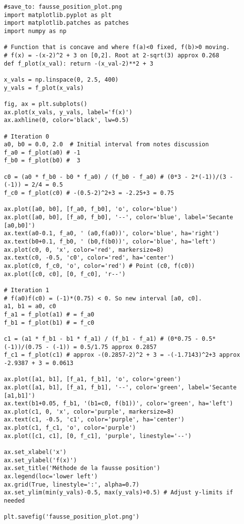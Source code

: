 \begin{verbatim}
#save_to: fausse_position_plot.png
import matplotlib.pyplot as plt
import matplotlib.patches as patches
import numpy as np

# Function that is concave and where f(a)<0 fixed, f(b)>0 moving.
# f(x) = -(x-2)^2 + 3 on [0,2]. Root at 2-sqrt(3) approx 0.268
def f_plot(x_val): return -(x_val-2)**2 + 3

x_vals = np.linspace(0, 2.5, 400)
y_vals = f_plot(x_vals)

fig, ax = plt.subplots()
ax.plot(x_vals, y_vals, label='f(x)')
ax.axhline(0, color='black', lw=0.5)

# Iteration 0
a0, b0 = 0.0, 2.0  # Initial interval from notes discussion
f_a0 = f_plot(a0) # -1
f_b0 = f_plot(b0) #  3

c0 = (a0 * f_b0 - b0 * f_a0) / (f_b0 - f_a0) # (0*3 - 2*(-1))/(3 - (-1)) = 2/4 = 0.5
f_c0 = f_plot(c0) # -(0.5-2)^2+3 = -2.25+3 = 0.75

ax.plot([a0, b0], [f_a0, f_b0], 'o', color='blue')
ax.plot([a0, b0], [f_a0, f_b0], '--', color='blue', label='Secante [a0,b0]')
ax.text(a0-0.1, f_a0, ' (a0,f(a0))', color='blue', ha='right')
ax.text(b0+0.1, f_b0, ' (b0,f(b0))', color='blue', ha='left')
ax.plot(c0, 0, 'x', color='red', markersize=8)
ax.text(c0, -0.5, 'c0', color='red', ha='center')
ax.plot(c0, f_c0, 'o', color='red') # Point (c0, f(c0))
ax.plot([c0, c0], [0, f_c0], 'r--')

# Iteration 1
# f(a0)f(c0) = (-1)*(0.75) < 0. So new interval [a0, c0].
a1, b1 = a0, c0
f_a1 = f_plot(a1) # = f_a0
f_b1 = f_plot(b1) # = f_c0

c1 = (a1 * f_b1 - b1 * f_a1) / (f_b1 - f_a1) # (0*0.75 - 0.5*(-1))/(0.75 - (-1)) = 0.5/1.75 approx 0.2857
f_c1 = f_plot(c1) # approx -(0.2857-2)^2 + 3 = -(-1.7143)^2+3 approx -2.9387 + 3 = 0.0613

ax.plot([a1, b1], [f_a1, f_b1], 'o', color='green')
ax.plot([a1, b1], [f_a1, f_b1], '--', color='green', label='Secante [a1,b1]')
ax.text(b1+0.05, f_b1, '(b1=c0, f(b1))', color='green', ha='left')
ax.plot(c1, 0, 'x', color='purple', markersize=8)
ax.text(c1, -0.5, 'c1', color='purple', ha='center')
ax.plot(c1, f_c1, 'o', color='purple')
ax.plot([c1, c1], [0, f_c1], 'purple', linestyle='--')

ax.set_xlabel('x')
ax.set_ylabel('f(x)')
ax.set_title('Méthode de la fausse position')
ax.legend(loc='lower left')
ax.grid(True, linestyle=':', alpha=0.7)
ax.set_ylim(min(y_vals)-0.5, max(y_vals)+0.5) # Adjust y-limits if needed

plt.savefig('fausse_position_plot.png')
\end{verbatim}

